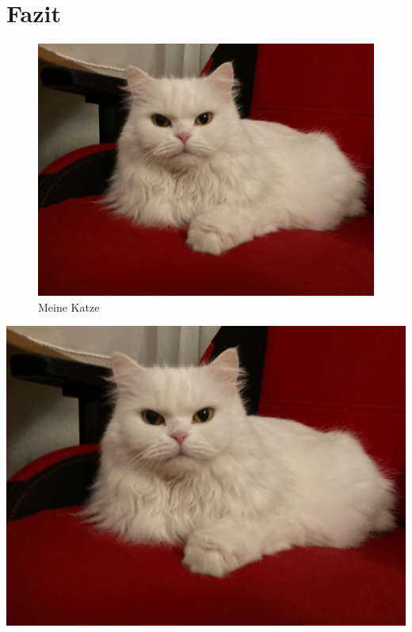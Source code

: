 \chapter{Fazit}\label{cha:Fazit}

\blindtext[5]

\begin{figure}
\includegraphics[width=\textwidth]{Bilder/Katze}
\caption{Meine Katze}\label{fig:Katze}
\end{figure}

\blindtext[5]

\includegraphics[width=\textwidth]{Bilder/Katze}
\label{fig:Katze2}


